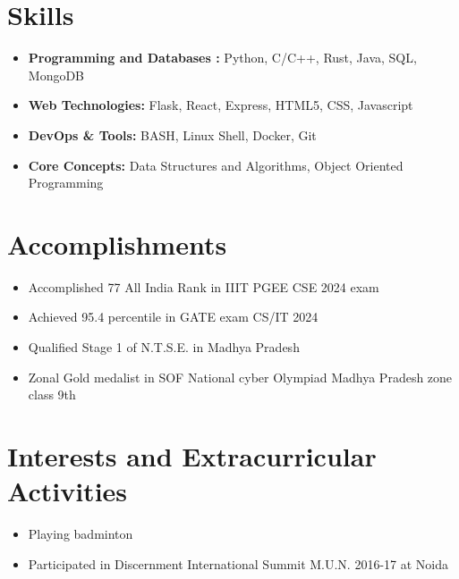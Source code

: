 \documentclass{article}
\begin{document}
\section*{Skills}
\begin{itemize}[leftmargin=*, itemsep=0pt, parsep=0pt]
	\item \textbf{Programming and Databases :} Python, C/C++, Rust, Java, SQL, MongoDB
	\item \textbf{Web Technologies:} Flask, React, Express, HTML5, CSS, Javascript
	\item \textbf{DevOps \& Tools:} BASH, Linux Shell, Docker, Git
	\item \textbf{Core Concepts:} Data Structures and Algorithms, Object Oriented Programming
\end{itemize}

\section*{Accomplishments}
\begin{itemize}
	\item Accomplished 77 All India Rank in IIIT PGEE CSE 2024 exam
	\item Achieved 95.4 percentile in GATE exam CS/IT 2024
	\item Qualified Stage 1 of N.T.S.E. in Madhya Pradesh
	\item Zonal Gold medalist in SOF National cyber Olympiad Madhya Pradesh zone class 9th
\end{itemize}

\section*{Interests and Extracurricular Activities}
\begin{itemize}
	\item Playing badminton
	\item Participated in Discernment International Summit M.U.N. 2016-17 at Noida
\end{itemize}
\end{document}
